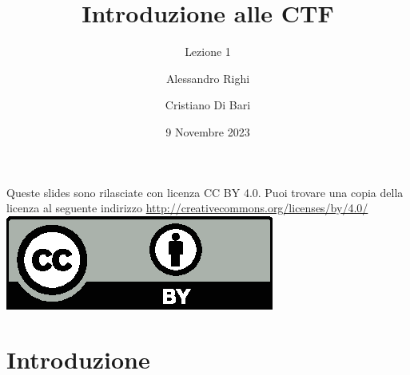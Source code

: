 \documentclass[12pt]{beamer}
\title{Introduzione alle CTF}
\subtitle{Lezione 1}
\author{Alessandro Righi \and Cristiano Di Bari}
\institute{Università degli Studi di Verona}
\date{9 Novembre 2023}
\begin{document}
\begin{frame}
\titlepage
\end{frame}

\begin{frame}
Queste slides sono rilasciate con licenza CC BY 4.0. Puoi trovare una copia della licenza al seguente indirizzo \url{http://creativecommons.org/licenses/by/4.0/}
\vfill
\center
\includegraphics{img/by.eps}
\end{frame}

\section{Introduzione}
\end{document}
